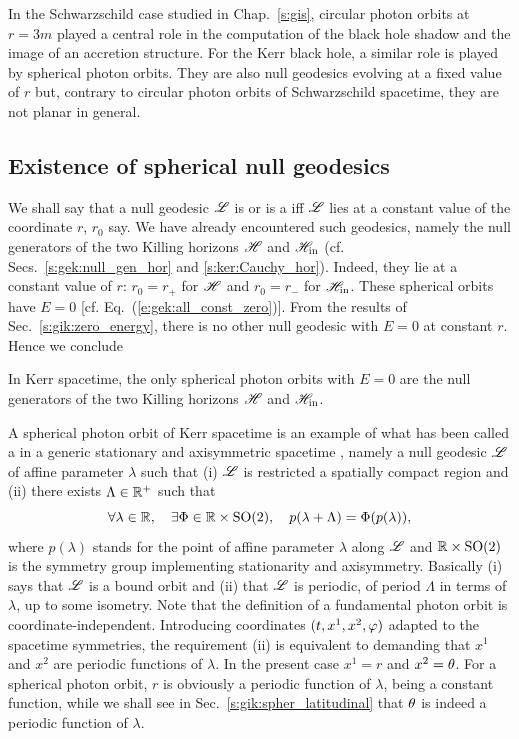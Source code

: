 In the Schwarzschild case studied in Chap.~\ref{s:gis}, circular photon
orbits at $r=3m$ played a central role in the computation of
the black hole shadow and the image of an accretion structure.
For the Kerr black hole, a similar role is played by spherical photon
orbits. They are also null geodesics evolving at a fixed value of $r$ but, contrary
to circular photon orbits of Schwarzschild spacetime, they are not planar
in general.


\subsection{Existence of spherical null geodesics} \label{s:gik:spher_existence}

We shall say that a null geodesic $\mathscr{L}$ is  or
is a  iff $\mathscr{L}$ lies at a constant value of the coordinate $r$, $r_0$ say.
We have already encountered such geodesics, namely the null generators of the two Killing horizons
$\mathscr{H}$ and $\mathscr{H}_{\rm in}$ (cf. Secs.~\ref{s:gek:null_gen_hor} and \ref{s:ker:Cauchy_hor}).
Indeed, they lie at a constant value of $r$: $r_0 = r_+$ for
$\mathscr{H}$ and $r_0 = r_-$ for $\mathscr{H}_{\rm in}$.  These spherical orbits have $E=0$
[cf. Eq.~(\ref{e:gek:all_const_zero})].
From the results of Sec.~\ref{s:gik:zero_energy}, there is no other null geodesic with $E=0$ at constant $r$.
Hence we conclude
\begin{greybox}
In Kerr spacetime, the only spherical photon orbits with $E=0$ are the null generators of the two Killing horizons $\mathscr{H}$ and $\mathscr{H}_{\rm in}$.
\end{greybox}

\begin{remark}
A spherical photon orbit of Kerr spacetime is an example of what has been called
a  in a generic stationary and axisymmetric
spacetime \cite{CunhaH18,CunhaHR17}, namely a null geodesic $\mathscr{L}$ of affine
parameter $\lambda$ such
that (i) $\mathscr{L}$ is restricted a spatially compact region and (ii) there exists
$\Lambda\in\mathbb{R}^+$ such that
\[
    \forall \lambda\in\mathbb{R}, \quad \exists \Phi\in \mathbb{R}\times\mathrm{SO(2)},
    \quad p(\lambda + \Lambda) = \Phi(p(\lambda)) ,
\]
where $p(\lambda)$ stands for the point of affine parameter $\lambda$ along $\mathscr{L}$
and $\mathbb{R}\times\mathrm{SO(2)}$ is the symmetry group implementing
stationarity and axisymmetry. Basically (i) says that $\mathscr{L}$ is a bound orbit
and (ii) that $\mathscr{L}$ is periodic, of period $\Lambda$ in terms of $\lambda$,
up to some isometry. Note that the definition of a fundamental photon orbit
is coordinate-independent. Introducing coordinates $(t,x^1,x^2,\varphi)$ adapted
to the spacetime symmetries, the requirement (ii) is equivalent to
demanding that $x^1$ and $x^2$ are periodic functions of $\lambda$. In the
present case $x^1 = r$ and $x^2 = \theta$. For a spherical photon orbit, $r$
is obviously a periodic function of $\lambda$, being a constant function, while
we shall see in Sec.~\ref{s:gik:spher_latitudinal} that $\theta$ is indeed
a periodic function of $\lambda$.
\end{remark}

